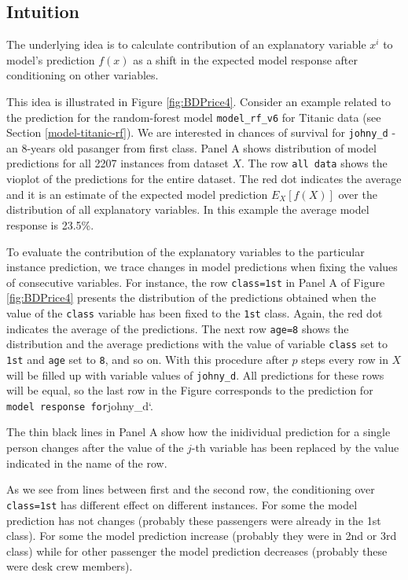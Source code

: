 \documentclass[12pt,]{krantz}
\begin{document}
\hypertarget{BDIntuition}{%
\subsection{Intuition}\label{BDIntuition}}

The underlying idea is to calculate contribution of an explanatory variable \(x^i\) to model's prediction \(f(x)\) as a shift in the expected model response after conditioning on other variables.

This idea is illustrated in Figure \ref{fig:BDPrice4}. Consider an example related to the prediction for the random-forest model \texttt{model\_rf\_v6} for Titanic data (see Section \ref{model-titanic-rf}). We are interested in chances of survival for \texttt{johny\_d} - an 8-years old pasanger from first class. Panel A shows distribution of model predictions for all 2207 instances from dataset \(X\). The row \texttt{all\ data} shows the vioplot of the predictions for the entire dataset. The red dot indicates the average and it is an estimate of the expected model prediction \(E_X[f(X)]\) over the distribution of all explanatory variables. In this example the average model response is 23.5\%.

To evaluate the contribution of the explanatory variables to the particular instance prediction, we trace changes in model predictions when fixing the values of consecutive variables. For instance, the row \texttt{class=1st} in Panel A of Figure \ref{fig:BDPrice4} presents the distribution of the predictions obtained when the value of the \texttt{class} variable has been fixed to the \texttt{1st} class. Again, the red dot indicates the average of the predictions. The next row \texttt{age=8} shows the distribution and the average predictions with the value of variable \texttt{class} set to \texttt{1st} and \texttt{age} set to \texttt{8}, and so on. With this procedure after \(p\) steps every row in \(X\) will be filled up with variable values of \texttt{johny\_d}. All predictions for these rows will be equal, so the last row in the Figure corresponds to the prediction for \texttt{model\ response\ for}johny\_d`.

The thin black lines in Panel A show how the inidividual prediction for a single person changes after the value of the \(j\)-th variable has been replaced by the value indicated in the name of the row.

As we see from lines between first and the second row, the conditioning over \texttt{class=1st} has different effect on different instances. For some the model prediction has not changes (probably these passengers were already in the 1st class). For some the model prediction increase (probably they were in 2nd or 3rd class) while for other passenger the model prediction decreases (probably these were desk crew members).
\end{document}
